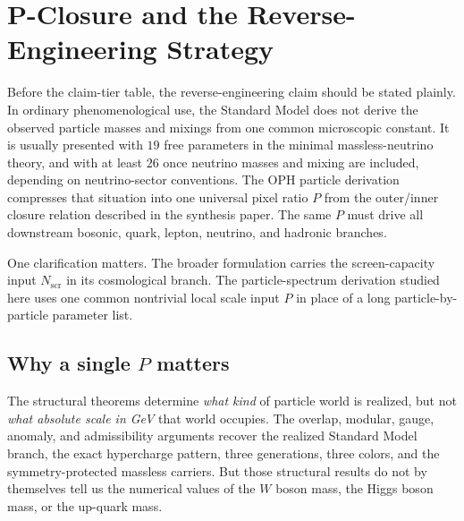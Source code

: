 \documentclass[11pt]{article}
\begin{document}
\section{P-Closure and the Reverse-Engineering Strategy}

Before the claim-tier table, the reverse-engineering claim should be stated plainly. In
ordinary phenomenological use, the Standard Model does not derive the observed particle masses and
mixings from one common microscopic constant. It is usually presented with \(19\) free parameters
in the minimal massless-neutrino theory, and with at least \(26\) once neutrino masses and mixing
are included, depending on neutrino-sector conventions. The OPH particle derivation compresses
that situation into one universal pixel ratio \(P\) from the outer/inner closure relation
described in the synthesis paper. The same \(P\) must drive all
downstream bosonic, quark, lepton, neutrino, and hadronic branches.

One clarification matters. The broader formulation carries the
screen-capacity input \(N_{\mathrm{scr}}\) in its cosmological branch. The particle-spectrum derivation studied here uses one common nontrivial local scale input \(P\) in place of a long particle-by-particle parameter list.

\subsection{Why a single \(P\) matters}

The structural theorems determine \emph{what kind} of particle world is
realized, but not \emph{what absolute scale in GeV} that world occupies. The overlap,
modular, gauge, anomaly, and admissibility arguments recover the realized Standard Model branch,
the exact hypercharge pattern, three generations, three colors, and the symmetry-protected
massless carriers. But those structural results do not by themselves tell us the numerical values
of the \(W\) boson mass, the Higgs boson mass, or the up-quark mass.
\end{document}
